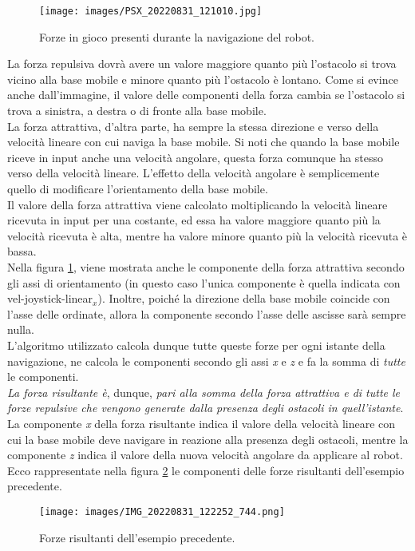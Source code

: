 \begin{figure}[h]
	\centering
	\texttt{[image: images/PSX\_20220831\_121010.jpg]}
	\caption{Forze in gioco presenti durante la navigazione del robot.}
	\label{fig:psx20220831121010}
\end{figure}

La forza repulsiva dovrà avere un valore maggiore quanto più l’ostacolo si trova vicino alla base mobile e minore quanto più l’ostacolo è lontano. Come si evince anche dall'immagine, il valore delle componenti della forza cambia se l’ostacolo si trova a sinistra, a destra o di fronte alla base mobile. \\
La forza attrattiva, d’altra parte, ha sempre la stessa direzione e verso della velocità lineare con cui naviga la base mobile. Si noti che quando la base mobile riceve in input anche una velocità angolare, questa forza comunque ha stesso verso della velocità lineare. L’effetto della velocità angolare è semplicemente quello di modificare l'orientamento della base mobile.\\
Il valore della forza attrattiva viene calcolato moltiplicando la velocità lineare ricevuta in input per una costante, ed essa ha valore maggiore quanto più la velocità ricevuta è alta, mentre ha valore minore quanto più la velocità ricevuta è bassa.\\
Nella figura \ref{fig:psx20220831121010}, viene mostrata anche le componente della forza attrattiva secondo gli assi di orientamento (in questo caso l'unica componente è quella indicata con vel-joystick-linear$ _{x} $). Inoltre, poiché la direzione della base mobile coincide con l’asse delle ordinate, allora la componente secondo l’asse delle ascisse sarà sempre nulla.\\
L’algoritmo utilizzato calcola dunque tutte queste forze per ogni istante della navigazione, ne calcola le componenti secondo gli assi \textit{x} e \textit{z} e fa la somma di \textit{tutte} le componenti. \\
\textit{La forza risultante è}, dunque, \textit{pari alla somma della forza attrattiva e di tutte le forze repulsive che vengono generate dalla presenza degli ostacoli in quell’istante}.\\ 
La componente \textit{x} della forza risultante indica il valore della velocità lineare con cui la base mobile deve navigare in reazione alla presenza degli ostacoli, mentre la componente \textit{z} indica il valore della nuova velocità angolare da applicare al robot.\\
Ecco rappresentate nella figura \ref{fig:img20220831122252744} le componenti delle forze risultanti dell'esempio precedente.
\begin{figure}[h]
	\centering
	\texttt{[image: images/IMG\_20220831\_122252\_744.png]}
	\caption{Forze risultanti dell'esempio precedente.}
	\label{fig:img20220831122252744}
\end{figure}

